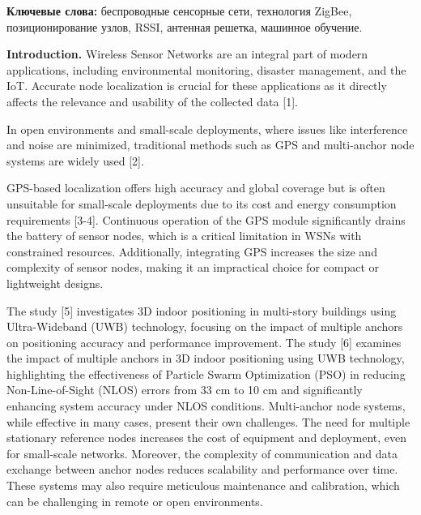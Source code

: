 {\bfseries Ключевые слова:} беспроводные сенсорные сети, технология ZigBee,
позиционирование узлов, RSSI, антенная решетка, машинное обучение.

\begin{multicols}{2}
{\bfseries Introduction.} Wireless Sensor Networks are an integral part of
modern applications, including environmental monitoring, disaster
management, and the IoT. Accurate node localization is crucial for these
applications as it directly affects the relevance and usability of the
collected data {[}1{]}.

In open environments and small-scale deployments, where issues like
interference and noise are minimized, traditional methods such as GPS
and multi-anchor node systems are widely used {[}2{]}.

GPS-based localization offers high accuracy and global coverage but is
often unsuitable for small-scale deployments due to its cost and energy
consumption requirements {[}3-4{]}. Continuous operation of the GPS
module significantly drains the battery of sensor nodes, which is a
critical limitation in WSNs with constrained resources. Additionally,
integrating GPS increases the size and complexity of sensor nodes,
making it an impractical choice for compact or lightweight designs.

The study {[}5{]} investigates 3D indoor positioning in multi-story
buildings using Ultra-Wideband (UWB) technology, focusing on the impact
of multiple anchors on positioning accuracy and performance improvement.
The study {[}6{]} examines the impact of multiple anchors in 3D indoor
positioning using UWB technology, highlighting the effectiveness of
Particle Swarm Optimization (PSO) in reducing Non-Line-of-Sight (NLOS)
errors from 33 cm to 10 cm and significantly enhancing system accuracy
under NLOS conditions. Multi-anchor node systems, while effective in
many cases, present their own challenges. The need for multiple
stationary reference nodes increases the cost of equipment and
deployment, even for small-scale networks. Moreover, the complexity of
communication and data exchange between anchor nodes reduces scalability
and performance over time. These systems may also require meticulous
maintenance and calibration, which can be challenging in remote or open
environments.


\end{multicols}
